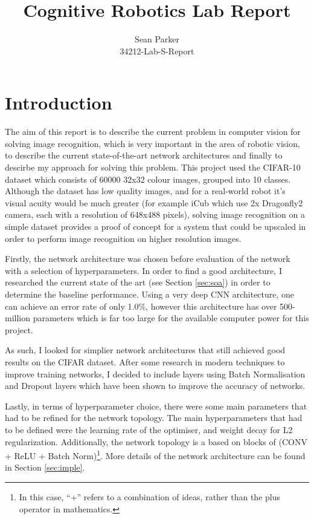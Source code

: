 \documentclass[12pt]{article}
\title{Cognitive Robotics Lab Report}
\author{Sean Parker\\
34212-Lab-S-Report}
\begin{document}
\maketitle

\section{Introduction}
The aim of this report is to describe the current problem in computer vision for solving image recognition, which is very important in the area of robotic vision, to describe the current state-of-the-art network architectures and finally to descirbe my approach for solving this problem. This project used the CIFAR-10 dataset which consists of 60000 32x32 colour images, grouped into 10 classes. Although the dataset has low quality images, and for a real-world robot it's visual acuity would be much greater (for example iCub which use 2x Dragonfly2 camera, each with a resolution of 648x488 pixels), solving image recognition on a simple dataset provides a proof of concept for a system that could be upscaled in order to perform image recognition on higher resolution images.

Firstly, the network architecture was chosen before evaluation of the network with a selection of hyperparameters. In order to find a good architecture, I researched the current state of the art (see Section \ref{sec:soa}) in order to determine the baseline performance. Using a very deep CNN architecture, one can achieve an error rate of only 1.0\%\cite{huang2018gpipe}, however this architecture has over 500-million parameters which is far too large for the available computer power for this project.

As such, I looked for simplier network architectures that still achieved good results on the CIFAR dataset. After some research in modern techniques to improve training networks, I decided to include layers using Batch Normalisation and Dropout layers which have been shown to improve the accuracy of networks\cite{dropout, batch-norm}.

Lastly, in terms of hyperparameter choice, there were some main parameters that had to be refined for the network topology. The main hyperparameters that had to be defined were the learning rate of the optimiser, and weight decay for L2 regularization. Additionally, the network topology is a based on blocks of (CONV + ReLU + Batch Norm)\footnote{In this case, ``+'' refers to a combination of ideas, rather than the plus operator in mathematics.}. More details of the network architecture can be found in Section \ref{sec:imple}.
\end{document}
